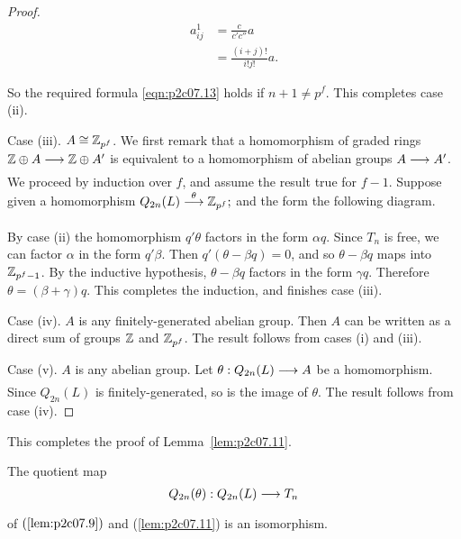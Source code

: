 \documentclass[../main]{subfiles}
\begin{document}
\begin{proof}
\begin{align*}
a_{ij}^1 & = \frac c {c' c''} a \\ & = \frac {(i + j)!} {i! j!} a.
\end{align*}

So the required formula \eqref{eqn:p2c07.13} holds if $n + 1 \ne p^f$. This completes case (ii). 

Case (iii). $A \cong \mathbb{Z}_{p^f}$. We first remark that a homomorphism of graded rings $\bbZ \oplus A \lar{} \bbZ \oplus A'$ is equivalent to a homomorphism of abelian groups $A \lar{} A'$. We proceed by induction over $f$, and assume the result true for $f - 1$. Suppose given a homomorphism $Q_{2n}(L) \lar{\theta} \bbZ_{p^f};$ and the form the following diagram.

\begin{center}
\end{center}

By case (ii) the homomorphism $q'\theta$ factors in the form $\alpha q$. Since $T_n$ is free, we can factor $\alpha$ in the form $q' \beta$. Then $q'(\theta - \beta q) = 0$, and so $\theta - \beta q$ maps into $\mathbb{Z}_{p^f - 1}$. By the inductive hypothesis, $\theta - \beta q$ factors in the form $\gamma q$. Therefore $\theta = (\beta + \gamma)q$. This completes the induction, and finishes case (iii).

Case (iv). $A$ is any finitely-generated abelian group. Then $A$ can be written as a direct sum of groups $\mathbb{Z}$ and $\mathbb{Z}_{p^f}$. The result follows from cases (i) and (iii).

Case (v). $A$ is any abelian group. Let $\theta : Q_{2n}(L) \lar{} A$ be a homomorphism. Since $Q_{2n}(L)$ is finitely-generated, so is the image of $\theta$. The result follows from case (iv).
\end{proof}

This completes the proof of Lemma~\ref{lem:p2c07.11}.

\begin{customcor}{7.14}
\label{cor:p2c07.14}
The quotient map \[Q_{2n}(\theta) : Q_{2n}(L) \lar{} T_n\] of $(\ref{lem:p2c07.9})$ and (\ref{lem:p2c07.11}) is an isomorphism. 
\end{customcor}
\end{document}
